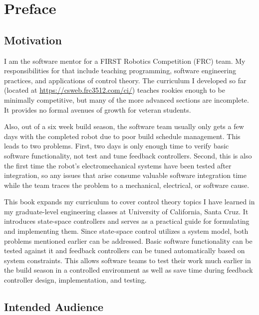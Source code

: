 
\chapter*{Preface}

\section*{Motivation}

I am the software mentor for a FIRST Robotics Competition (FRC) team. My
responsibilities for that include teaching programming, software engineering
practices, and applications of control theory. The curriculum I developed so far
(located at \url{https://csweb.frc3512.com/ci/}) teaches rookies enough to be
minimally competitive, but many of the more advanced sections are incomplete. It
provides no formal avenues of growth for veteran students.

Also, out of a six week build season, the software team usually only gets a few
days with the completed robot due to poor build schedule management. This leads
to two problems. First, two days is only enough time to verify basic software
functionality, not test and tune feedback controllers. Second, this is also the
first time the robot's electromechanical systems have been tested after
integration, so any issues that arise consume valuable software integration time
while the team traces the problem to a mechanical, electrical, or software
cause.

This book expands my curriculum to cover control theory topics I have learned in
my graduate-level engineering classes at University of California, Santa Cruz.
It introduces state-space controllers and serves as a practical guide for
formulating and implementing them. Since state-space control utilizes a system
model, both problems mentioned earlier can be addressed. Basic software
functionality can be tested against it and feedback controllers can be tuned
automatically based on system constraints. This allows software teams to test
their work much earlier in the build season in a controlled environment as well
as save time during feedback controller design, implementation, and testing.

\section*{Intended Audience}

